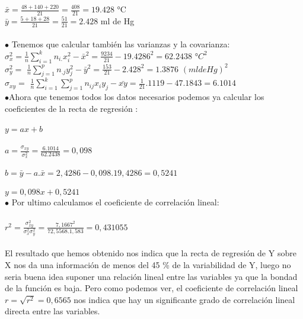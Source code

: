 	$\bar{x} = \frac{48 + 140 + 220}{21} = \frac{408}{21} = 19.428 $ °C
	\\ 
	
		$\bar{y} = \frac{5 + 18 + 28}{21} = \frac{51}{21} = 2.428  $ ml de Hg
		\\
	\\
	
	$\bullet$ Tenemos que calcular también las varianzas y la covarianza: \\
	
	
	
		 $\sigma_{x}^{2} =  $$\frac{1}{n}\sum^{k}_{i=1}n_{i.}x_{i}^{2} - \bar{x}^{2} = \frac{9234}{21} - 19.4286^{2} = 62.2438 $ $ °C^{2} $ \\
	 
	 $\sigma_{y}^{2} = $ $\frac{1}{n}\sum^{p}_{j=1}n_{.j}y_{j}^{2} - \bar{y}^{2} = \frac{153}{21} - 2.428^{2} = 1.3876 $ $(ml de Hg)^{2}$ \\
	 
	  $\sigma_{xy} = $ $\frac{1}{n}\sum^{k}_{i=1}\sum^{p}_{j=1}n_{ij}x_{i}y_{j} - \bar{xy}= \frac{1}{21}.1119 - 47.1843 = 6.1014 $ \\
	
	  
	  $\bullet$Ahora que tenemos todos los datos necesarios podemos ya calcular los coeficientes de la recta de regresión :\\ \\
	  $y = ax +b $\\ \\
	  $a = \frac{\sigma_{xy}}{\sigma_{x}^{2}} = \frac{6.1014}{62.2438} = 0,098$\\ \\
	  $b = \bar{y} - a.\bar{x} = 2,4286 - 0,098 .19,4286 = 0,5241$\\ \\
	  $y = 0,098x + 0,5241 $\\ 
	  
	  $\bullet$ Por ultimo calculamos el coeficiente de correlación lineal:\\ \\
	  
	  $r^{2} = \frac{\sigma_{xy}^{2}}{\sigma_{x}^{2}\sigma_{y}^{2}} = \frac{7,1667^{2}}{72,5568 . 1,583} = 0,431055$\\ \\
	  El resultado que hemos obtenido nos indica que la recta de regresión de Y sobre X nos da una información de menos
	  del 45 \% de la variabilidad de Y, luego no seria buena idea suponer una relación lineal entre las variables ya que la bondad de la función es baja. 
	  Pero como podemos ver, el coeficiente de correlación lineal $r = \sqrt{r^{2}} = 0, 6565$ nos indica que hay un significante grado de correlación lineal directa entre las variables.
